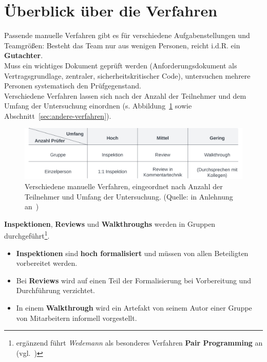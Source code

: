 \section{Überblick über die Verfahren}

Passende manuelle Verfahren gibt es für verschiedene Aufgabenstellungen und Teamgrößen: Besteht das Team nur aus wenigen Personen, reicht i.d.R. ein \textbf{Gutachter}.\\
Muss ein wichtiges Dokument geprüft werden (Anforderungsdokument als Vertragsgrundlage, zentraler, sicherheitskritischer Code), untersuchen mehrere Personen systematisch den Prüfgegenstand.\\

\noindent
Verschiedene Verfahren lassen sich nach der Anzahl der Teilnehmer und dem Umfang der Untersuchung einordnen (s. Abbildung~\ref{fig:manuelleverfahren} sowie Abschnitt~\ref{sec:andere-verfahren}).

\begin{figure}
    \centering
    \includegraphics[scale=0.4]{part four/Manuelle Verfahren/img/manuelleverfahren}
    \caption{Verschiedene manuelle Verfahren, eingeordnet nach Anzahl der Teilnehmer und Umfang der Untersuchung. (Quelle: in Anlehnung an~\cite[Tab. 3.1, 17]{Wed09c})}
    \label{fig:manuelleverfahren}
\end{figure}

\noindent
\textbf{Inspektionen}, \textbf{Reviews} und \textbf{Walkthroughs} werden in Gruppen durchgeführt\footnote{
ergänzend führt \textit{Wedemann} als besonderes Verfahren \textbf{Pair Programming} an (vgl.~\cite[18]{Wed09c})
}.\\

\begin{itemize}
    \item \textbf{Inspektionen} sind \textbf{hoch formalisiert} und müssen von allen Beteiligten vorbereitet werden.
    \item Bei \textbf{Reviews} wird auf einen Teil der Formalisierung bei Vorbereitung und Durchführung verzichtet.
    \item In einem \textbf{Walkthrough} wird ein Artefakt von seinem Autor einer Gruppe von Mitarbeitern informell vorgestellt.
\end{itemize}

